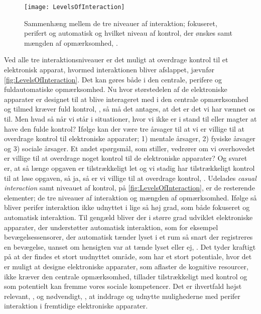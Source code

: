 %
\begin{figure}[H]
	\centering
	\texttt{[image: LevelsOfInteraction]}
	\caption{Sammenhæng mellem de tre niveauer af interaktion; fokuseret, perifert og automatisk og hvilket niveau af kontrol, der ønskes samt mængden af opmærksomhed,  \parencite[s. 118]{PDF:PeripheralInteraction}.}
	\label{fig:LevelsOfInteraction}
\end{figure}
\noindent
%
Ved alle tre interaktionsniveauer er det muligt at overdrage kontrol til et elektronisk apparat, hvormed interaktionen bliver afslappet, jævnfør \autoref{fig:LevelsOfInteraction}. Det kan gøres både i den centrale, perifere og fuldautomatiske opmærksomhed. Nu hvor størstedelen af de elektroniske apparater er designet til at blive interageret med i den centrale opmærksomhed og tilmed kræver fuld kontrol, \parencite[s. 118]{PDF:PeripheralInteraction}, så må det antages, at det er det vi har vænnet os til. Men hvad så når vi står i situationer, hvor vi ikke er i stand til eller magter at have den fulde kontrol? Ifølge \textcite[s. 123]{PDF:PeripheralInteraction} kan der være tre årsager til at vi er villige til at overdrage kontrol til elektroniske apparater; 1) mentale årsager, 2) fysiske årsager og 3) sociale årsager. Et andet spørgsmål, som \textcite[s. 124]{PDF:PeripheralInteraction} stiller, vedrører om vi overhovedet er villige til at overdrage noget kontrol til de elektroniske apparater? Og svaret er, at så længe opgaven er tilstrækkeligt let og vi stadig har tilstrækkeligt kontrol til at løse opgaven, så ja, så er vi villige til at overdrage kontrol, \parencite[s. 124]{PDF:PeripheralInteraction}.\blankline
%
Udelades \textit{casual interaction} samt niveauet af kontrol, på \autoref{fig:LevelsOfInteraction}, er de resterende elementer; de tre niveauer af interaktion og mængden af opmærksomhed. Ifølge \textcite[s. 6]{PDF:PeripheralInteraction} så bliver perifer interaktion ikke udnyttet i lige så høj grad, som både fokuseret og automatisk interaktion. Til gengæld bliver der i større grad udviklet elektroniske apparater, der understøtter automatisk interaktion, som for eksempel bevægelsessensorer, der automatisk tænder lyset i et rum så snart der registreres en bevægelse, uanset om hensigten var at tænde lyset eller ej, \parencite[s. 5]{PDF:PeripheralInteraction}.\blankline
% 
Det tyder kraftigt på at der findes et stort uudnyttet område, som har et stort potentiale, hvor det er muligt at designe elektroniske apparater, som aflaster de kognitive resourcer, ikke kræver den centrale opmærksomhed, tillader tilstrækkeligt med kontrol og som potentielt kan fremme vores sociale kompetencer. Det er ihvertfald højst relevant, \parencite[s. 239]{PDF:PICharacteristicsAndConsiderations}, og nødvendigt, \parencite[s. 3]{PDF:TheComingAgeOfCalmTech}, at inddrage og udnytte mulighederne med perifer interaktion i fremtidige elektroniske apparater. 

